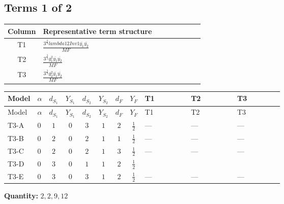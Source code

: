 \documentclass[8pt]{article}
\begin{document}
\begin{landscape}
\subsection*{Terms 1 of 2}
\begin{center}
\begin{tabular}{@{}c >{\raggedright\arraybackslash}p{0.82\linewidth}@{}}
\toprule
Column & Representative term structure \\
\midrule
T1 & \(\displaystyle \frac{3^{\frac{3}{4}} lambda12Inv1 \overline{y_{1}} \overline{y_{2}}}{MF}\) \\
\midrule
T2 & \(\displaystyle \frac{3^{\frac{3}{4}} g_{1}^{2} \overline{y_{1}} \overline{y_{2}}}{MF}\) \\
\midrule
T3 & \(\displaystyle \frac{3^{\frac{3}{4}} g_{2}^{2} \overline{y_{1}} \overline{y_{2}}}{MF}\) \\
\midrule
\bottomrule
\end{tabular}
\end{center}
\smallskip
\tiny
\begin{longtable}{@{}llcccccc >{\raggedright\arraybackslash}p{0.21\linewidth} >{\raggedright\arraybackslash}p{0.21\linewidth} >{\raggedright\arraybackslash}p{0.21\linewidth}@{}}
\toprule
Model & $\alpha$ & $d_{S_1}$ & $Y_{S_1}$ & $d_{S_2}$ & $Y_{S_2}$ & $d_F$ & $Y_F$ & T1 & T2 & T3 \\
\midrule
\endfirsthead
\toprule
Model & $\alpha$ & $d_{S_1}$ & $Y_{S_1}$ & $d_{S_2}$ & $Y_{S_2}$ & $d_F$ & $Y_F$ & T1 & T2 & T3 \\
\midrule
\endhead
T3-A & $0$ & $1$ & $0$ & $3$ & $1$ & $2$ & $\frac{1}{2}$ & --- & --- & --- \\
\midrule
T3-B & $0$ & $2$ & $0$ & $2$ & $1$ & $1$ & $\frac{1}{2}$ & --- & --- & --- \\
\midrule
T3-C & $0$ & $2$ & $0$ & $2$ & $1$ & $3$ & $\frac{1}{2}$ & --- & --- & --- \\
\midrule
T3-D & $0$ & $3$ & $0$ & $1$ & $1$ & $2$ & $\frac{1}{2}$ & \scriptsize\adjustbox{max width=\linewidth}{$\begin{gathered} \frac{3^{\frac{3}{4}} lambda12Inv1 \overline{y_{1}} \overline{y_{2}}}{6 MF}\end{gathered}$} & \scriptsize\adjustbox{max width=\linewidth}{$\begin{gathered} \frac{3^{\frac{3}{4}} g_{1}^{2} \overline{y_{1}} \overline{y_{2}}}{8 MF}\end{gathered}$} & \scriptsize\adjustbox{max width=\linewidth}{$\begin{gathered} \frac{17 \cdot 3^{\frac{3}{4}} g_{2}^{2} \overline{y_{1}} \overline{y_{2}}}{24 MF}\end{gathered}$} \\
\midrule
T3-E & $0$ & $3$ & $0$ & $3$ & $1$ & $2$ & $\frac{1}{2}$ & --- & --- & --- \\
\midrule
\bottomrule
\end{longtable}
\clearpage
\noindent\textbf{Quantity: }$\mathrm{2,2,9,12}$\par\smallskip

\end{landscape}
\end{document}

